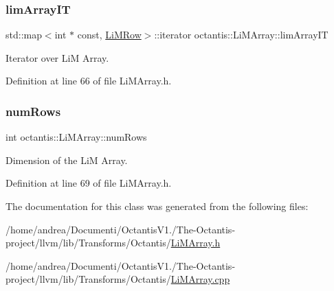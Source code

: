 \subsubsection{\texorpdfstring{lim\+Array\+IT}{limArrayIT}}
{\footnotesize\ttfamily std\+::map$<$int $\ast$ const, \hyperlink{structoctantis_1_1LiMArray_1_1LiMRow}{Li\+M\+Row}$>$\+::iterator octantis\+::\+Li\+M\+Array\+::lim\+Array\+IT}



Iterator over LiM Array. 



Definition at line 66 of file Li\+M\+Array.\+h.

\mbox{\label{classoctantis_1_1LiMArray_a03a3f7e32f34fde2b7776dae38a40013}} 
\subsubsection{\texorpdfstring{num\+Rows}{numRows}}
{\footnotesize\ttfamily int octantis\+::\+Li\+M\+Array\+::num\+Rows}



Dimension of the LiM Array. 



Definition at line 69 of file Li\+M\+Array.\+h.



The documentation for this class was generated from the following files\+:\begin{DoxyCompactItemize}
\item 
/home/andrea/\+Documenti/\+Octantis\+V1./\+The-\/\+Octantis-\/project/llvm/lib/\+Transforms/\+Octantis/\hyperlink{LiMArray_8h}{Li\+M\+Array.\+h}\item 
/home/andrea/\+Documenti/\+Octantis\+V1./\+The-\/\+Octantis-\/project/llvm/lib/\+Transforms/\+Octantis/\hyperlink{LiMArray_8cpp}{Li\+M\+Array.\+cpp}\end{DoxyCompactItemize}
